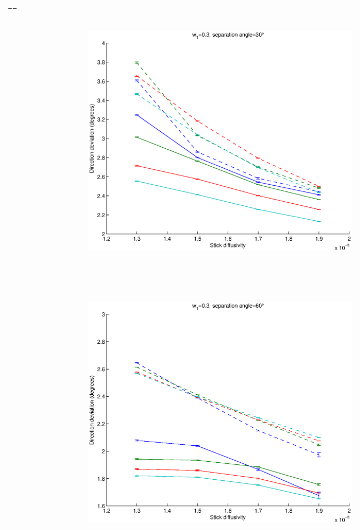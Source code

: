 \documentclass{article}
\begin{document}
\begin{figure}[H]
\begin{adjustwidth}{-\oddsidemargin}{-\rightmargin}
  \begin{subfigure}{0.8\paperwidth}
    \begin{subfigure}{0.3\textwidth}
      \centering
      \includegraphics[width=\textwidth]{figures/synth_bas_weights_diffus__snr=20__w1=3__angle=30.eps}
    \end{subfigure}
      ~
      \begin{subfigure}{0.3\textwidth}
        \centering
        \includegraphics[width=\textwidth]{figures/synth_bas_weights_diffus__snr=20__w1=3__angle=60.eps}
      \end{subfigure}

\end{subfigure}
\end{adjustwidth}
\end{figure}
\end{document}
